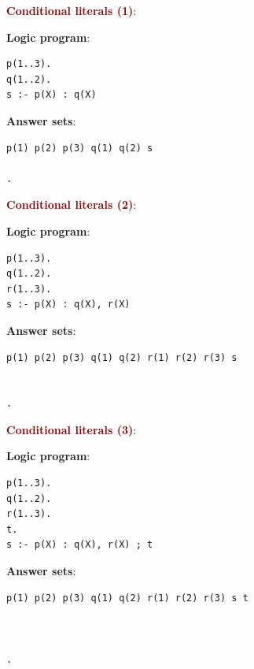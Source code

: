\vspace{0.35cm}

{\Large \textbf{\textcolor{Maroon}{Conditional literals (1)}}}: \\
\begin{minipage}{0.6\textwidth}
\textbf{Logic program}:
\begin{lstlisting}
p(1..3).
q(1..2).
s :- p(X) : q(X)
\end{lstlisting}
\end{minipage}
\begin{minipage}{0.3\textwidth}
\textbf{Answer sets}:
\begin{lstlisting}
p(1) p(2) p(3) q(1) q(2) s

.
\end{lstlisting}
\end{minipage}

\vspace{0.35cm}

{\Large \textbf{\textcolor{Maroon}{Conditional literals (2)}}}: \\
\begin{minipage}{0.4\textwidth}
\textbf{Logic program}:
\begin{lstlisting}
p(1..3).
q(1..2).
r(1..3).
s :- p(X) : q(X), r(X)
\end{lstlisting}
\end{minipage}
\begin{minipage}{0.6\textwidth}
\textbf{Answer sets}:
\begin{lstlisting}
p(1) p(2) p(3) q(1) q(2) r(1) r(2) r(3) s


.
\end{lstlisting}
\end{minipage}

\vspace{0.35cm}

{\Large \textbf{\textcolor{Maroon}{Conditional literals (3)}}}: \\
\begin{minipage}{0.4\textwidth}
\textbf{Logic program}:
\begin{lstlisting}
p(1..3).
q(1..2).
r(1..3).
t.
s :- p(X) : q(X), r(X) ; t
\end{lstlisting}
\end{minipage}
\begin{minipage}{0.6\textwidth}
\textbf{Answer sets}:
\begin{lstlisting}
p(1) p(2) p(3) q(1) q(2) r(1) r(2) r(3) s t



.
\end{lstlisting}
\end{minipage}

